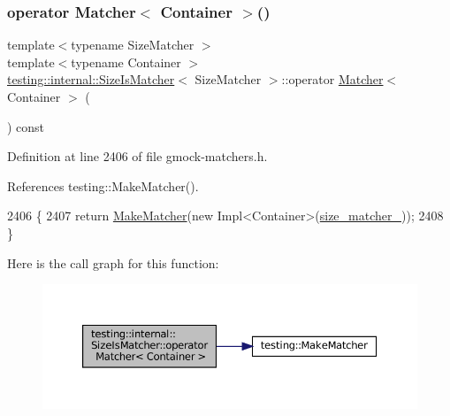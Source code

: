 \mbox{\label{classtesting_1_1internal_1_1SizeIsMatcher_abeb0ee5ead7c7a3066dab0d4efe793ea}} 
\subsubsection{\texorpdfstring{operator Matcher$<$ Container $>$()}{operator Matcher< Container >()}}
{\footnotesize\ttfamily template$<$typename Size\+Matcher $>$ \\
template$<$typename Container $>$ \\
\hyperlink{classtesting_1_1internal_1_1SizeIsMatcher}{testing\+::internal\+::\+Size\+Is\+Matcher}$<$ Size\+Matcher $>$\+::operator \hyperlink{classtesting_1_1Matcher}{Matcher}$<$ Container $>$ (\begin{DoxyParamCaption}{ }\end{DoxyParamCaption}) const\hspace{0.3cm}{\ttfamily [inline]}}



Definition at line 2406 of file gmock-\/matchers.\+h.



References testing\+::\+Make\+Matcher().


\begin{DoxyCode}
2406                                       \{
2407     \textcolor{keywordflow}{return} \hyperlink{namespacetesting_a37fd8029ac00e60952440a3d9cca8166}{MakeMatcher}(\textcolor{keyword}{new} Impl<Container>(\hyperlink{classtesting_1_1internal_1_1SizeIsMatcher_aa5a60a11ee3fb9021024e0306cf2a2a0}{size\_matcher\_}));
2408   \}
\end{DoxyCode}
Here is the call graph for this function\+:
\nopagebreak
\begin{figure}[H]
\begin{center}
\leavevmode
\includegraphics[width=350pt]{classtesting_1_1internal_1_1SizeIsMatcher_abeb0ee5ead7c7a3066dab0d4efe793ea_cgraph}
\end{center}
\end{figure}



